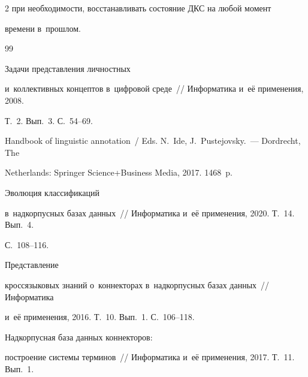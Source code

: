 \begin{multicols}{2}
при необходимости, восстанавливать состояние ДКС на любой момент 


времени в~прошлом.





\vspace*{-3pt}





{\small\frenchspacing


{%




\begin{thebibliography}{99}









 Задачи представления личностных 


и~коллективных концептов в~цифровой среде~// Информатика и~её применения, 2008. 


Т.~2. Вып.~3. С.~54--69.




Handbook of linguistic annotation~/ Eds. N.~Ide, J.~Pustejovsky.~--- Dordrecht, The 


Netherlands: Springer Science\;+\;Business Media, 2017. 1468~p.




 Эволюция классификаций 


в~надкорпусных базах данных~// Информатика и~её применения, 2020. Т.~14. Вып.~4. 


С.~108--116.




 Представление 


кроссязыковых знаний о~коннекторах в~надкорпусных базах данных~// Информатика 


и~её применения, 2016. Т.~10. Вып.~1. С.~106--118.




 Надкорпусная база данных коннекторов: 


построение системы терминов~// Информатика и~её применения, 2017. Т.~11. Вып.~1. 



\end{thebibliography}}}
\end{multicols}
